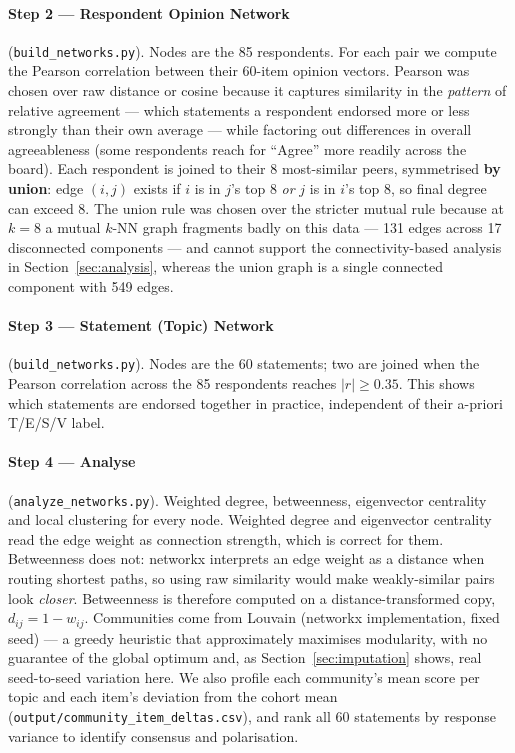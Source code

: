 \documentclass[11pt,a4paper]{article}
\begin{document}
\paragraph{Step 2 --- Respondent Opinion Network} (\texttt{build\_networks.py}). Nodes are the 85 respondents. For each pair we compute the Pearson correlation between their 60-item opinion vectors. Pearson was chosen over raw distance or cosine because it captures similarity in the \emph{pattern} of relative agreement --- which statements a respondent endorsed more or less strongly than their own average --- while factoring out differences in overall agreeableness (some respondents reach for ``Agree'' more readily across the board). Each respondent is joined to their 8 most-similar peers, symmetrised \textbf{by union}: edge $(i,j)$ exists if $i$ is in $j$'s top 8 \emph{or} $j$ is in $i$'s top 8, so final degree can exceed 8. The union rule was chosen over the stricter mutual rule because at $k=8$ a mutual $k$-NN graph fragments badly on this data --- 131 edges across 17 disconnected components --- and cannot support the connectivity-based analysis in Section~\ref{sec:analysis}, whereas the union graph is a single connected component with 549 edges.

\paragraph{Step 3 --- Statement (Topic) Network} (\texttt{build\_networks.py}). Nodes are the 60 statements; two are joined when the Pearson correlation across the 85 respondents reaches $|r| \geq 0.35$. This shows which statements are endorsed together in practice, independent of their a-priori T/E/S/V label.

\paragraph{Step 4 --- Analyse} (\texttt{analyze\_networks.py}). Weighted degree, betweenness, eigenvector centrality and local clustering for every node. Weighted degree and eigenvector centrality read the edge weight as connection strength, which is correct for them. Betweenness does not: networkx interprets an edge weight as a distance when routing shortest paths, so using raw similarity would make weakly-similar pairs look \emph{closer}. Betweenness is therefore computed on a distance-transformed copy, $d_{ij} = 1 - w_{ij}$. Communities come from Louvain (networkx implementation, fixed seed) --- a greedy heuristic that approximately maximises modularity, with no guarantee of the global optimum and, as Section~\ref{sec:imputation} shows, real seed-to-seed variation here. We also profile each community's mean score per topic and each item's deviation from the cohort mean (\texttt{output/community\_item\_deltas.csv}), and rank all 60 statements by response variance to identify consensus and polarisation.
\end{document}
